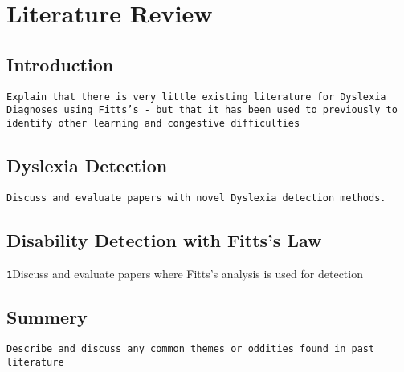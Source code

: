 \section{Literature Review}
	\subsection{Introduction}
		\texttt{Explain that there is very little existing literature for Dyslexia Diagnoses using Fitts's - but that it has been used to previously to identify other learning and congestive difficulties}
	
	\subsection{Dyslexia Detection}
		\texttt{Discuss and evaluate papers with novel Dyslexia detection methods.}
	
	\subsection{Disability Detection with Fitts's Law}
		\texttt1{Discuss and evaluate papers where Fitts's analysis is used for detection}
			
	\subsection{Summery}
		\texttt{Describe and discuss any common themes or oddities found in past literature}
		
\newpage